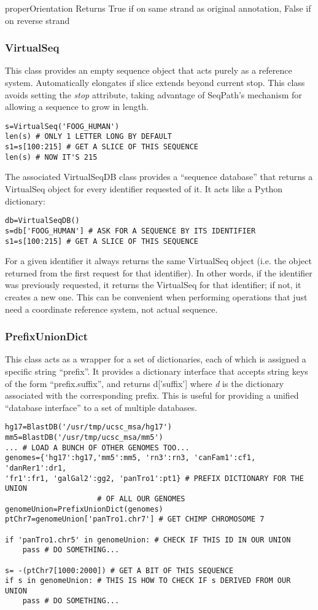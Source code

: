 \documentclass{howto}
\begin{document}
\begin{funcdesc}{properOrientation}{}
  Returns True if on same strand as original annotation, False if on reverse strand
\end{funcdesc}


\subsubsection{VirtualSeq}
This class provides an empty sequence object that
acts purely as a reference system.
Automatically elongates if slice extends beyond current stop.
This class avoids setting the {\em stop} attribute, taking advantage
of SeqPath's mechanism for allowing a sequence to grow in length.
\begin{verbatim}
s=VirtualSeq('FOOG_HUMAN')
len(s) # ONLY 1 LETTER LONG BY DEFAULT
s1=s[100:215] # GET A SLICE OF THIS SEQUENCE
len(s) # NOW IT'S 215
\end{verbatim}

The associated VirtualSeqDB class provides a ``sequence database''
that returns a VirtualSeq object for every identifier requested of
it.  It acts like a Python dictionary:
\begin{verbatim}
db=VirtualSeqDB()
s=db['FOOG_HUMAN'] # ASK FOR A SEQUENCE BY ITS IDENTIFIER
s1=s[100:215] # GET A SLICE OF THIS SEQUENCE
\end{verbatim}
For a given identifier it always returns the same VirtualSeq
object (i.e. the object returned from the first request for that identifier).
In other words, if the identifier was previously requested,
it returns the VirtualSeq for that identifier; if not, it 
creates a new one.
This can be convenient when performing operations that just
need a coordinate reference system, not actual sequence.


\subsubsection{PrefixUnionDict}
This class acts as a wrapper for a set of dictionaries, each
of which is assigned a specific string ``prefix''.  It provides
a dictionary interface that accepts string keys of the form
``prefix.suffix'', and returns d['suffix'] where {\em d} is
the dictionary associated with the corresponding prefix.  This
is useful for providing a unified ``database interface'' to a
set of multiple databases.
\begin{verbatim}
hg17=BlastDB('/usr/tmp/ucsc_msa/hg17')
mm5=BlastDB('/usr/tmp/ucsc_msa/mm5')
... # LOAD A BUNCH OF OTHER GENOMES TOO...
genomes={'hg17':hg17,'mm5':mm5, 'rn3':rn3, 'canFam1':cf1, 'danRer1':dr1,
'fr1':fr1, 'galGal2':gg2, 'panTro1':pt1} # PREFIX DICTIONARY FOR THE UNION 
					 # OF ALL OUR GENOMES
genomeUnion=PrefixUnionDict(genomes)
ptChr7=genomeUnion['panTro1.chr7'] # GET CHIMP CHROMOSOME 7

if 'panTro1.chr5' in genomeUnion: # CHECK IF THIS ID IN OUR UNION
    pass # DO SOMETHING...

s= -(ptChr7[1000:2000]) # GET A BIT OF THIS SEQUENCE
if s in genomeUnion: # THIS IS HOW TO CHECK IF s DERIVED FROM OUR UNION
    pass # DO SOMETHING... 
\end{verbatim}
\end{document}
